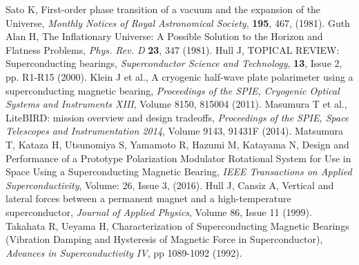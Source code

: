 \documentclass[a4paper]{jpconf}
\begin{document}
\vspace*{5mm}
\begin{thebibliography}{99}

Sato K, First-order phase transition of a vacuum and the expansion of the Universe, {\it Monthly Notices of Royal Astronomical Society}, {\bf 195}, 467, (1981).
Guth Alan H, The Inflationary Universe: A Possible Solution to the Horizon and Flatness Problems, {\it Phys. Rev. D} {\bf 23}, 347 (1981).
Hull J, TOPICAL REVIEW: Superconducting bearings, {\it  Superconductor Science and Technology}, {\bf 13}, Issue 2, pp. R1-R15 (2000).
Klein J et al., A cryogenic half-wave plate polarimeter using a superconducting magnetic bearing, {\it Proceedings of the SPIE, Cryogenic Optical Systems and Instruments XIII}, Volume 8150, 815004 (2011).
Masumura T et al., LiteBIRD: mission overview and design tradeoffs, {\it Proceedings of the SPIE, Space Telescopes and Instrumentation 2014}, Volume 9143, 91431F (2014).
Matsumura T, Kataza H, Utsunomiya S, Yamamoto R, Hazumi M, Katayama N, Design and Performance of a Prototype Polarization Modulator Rotational System for Use in Space Using a Superconducting Magnetic Bearing, { \it IEEE Transactions on Applied Superconductivity}, Volume: 26, Issue 3, (2016).
Hull J, Cansiz A, Vertical and lateral forces between a permanent magnet and a high-temperature superconductor, {\it Journal of Applied Physics}, Volume 86, Issue 11 (1999).
Takahata R, Ueyama H, Characterization of Superconducting Magnetic Bearings (Vibration Damping and Hysteresis of Magnetic Force in Superconductor), {\it Advances in Superconductivity IV}, pp 1089-1092 (1992).

\end{thebibliography}
\end{document}
